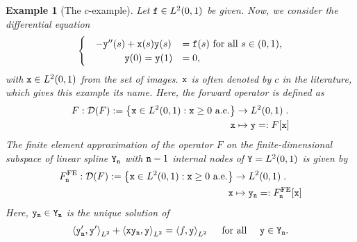 \documentclass[10pt]{article}
\numberwithin{equation}{section}
\newtheorem{example}[example]{Example}
\theoremstyle{nonumberplain}
\newcommand{\set}[1]{\left\{#1\right\}}
\newcommand{\inner}[2]{\left<#1,#2\right>}
\newcommand{\Y}{{\tt Y}}
\newcommand{\y}{{\tt y}}
\newcommand{\n}{{\tt n}}
\newcommand{\x}{{\tt x}}
\begin{document}
\begin{example}[The $c$-example] \label{ex:2point} Let ${\tt f} \in L^2(0,1)$ be given. Now, we consider the differential equation
	\begin{equation}
		\begin{cases}\label{eq:invillpos}
			\quad -\y''(s) + \x(s)\y(s) &= {\tt f}(s) \text{ for all }s \in (0,1),\\
			\quad  \quad \quad \quad \y(0) = \y(1) &= 0,
		\end{cases}		
	\end{equation}
	with $\x \in L^2(0,1)$ from the set of images. $\x$ is often denoted by $c$ in the literature, which gives this example its name. Here, the forward operator is defined as 
	\begin{equation*}
		\begin{aligned}
			F: \mathcal{D}(F):= \set{\x \in L^2(0,1): \x \geq 0 \text{ a.e.} } & \to L^2(0,1)\;.\\
			\x & \mapsto \y =: F[\x]
		\end{aligned}
	\end{equation*}
	The finite element approximation of the operator $F$ on the finite-dimensional subspace of linear spline $\Y_\n$ with $\n-1$ internal nodes of $\Y = L^2(0,1)$ is given by
	\begin{equation} \label{eq:fec}
		\begin{aligned}
			F^{\text{FE}}_\n: \mathcal{D}(F):= \set{\x \in L^2(0,1): \x \geq 0 \text{ a.e.}} & \to L^2(0,1)\;.\\
			\x & \mapsto \y_\n=: F^{\text{FE}}_\n[\x]
		\end{aligned}
	\end{equation}
	Here, $\y_\n\in\Y_\n$ is the unique solution of 
	\begin{equation*}
		\inner{\y_\n'}{\tt y'}_{L^2}+\inner{\x\y_\n}{\tt y}_{L^2} = \inner{f}{\tt y}_{L^2} \quad \text{ for all } \quad \tt y\in \Y_\n.
	\end{equation*}


\end{example}
\end{document}
